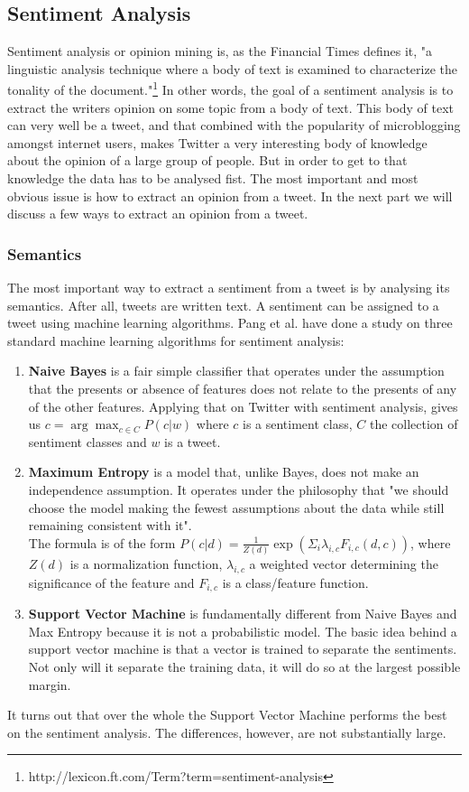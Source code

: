 \documentclass{article}
\begin{document}
\subsection{Sentiment Analysis}
Sentiment analysis or opinion mining is, as the Financial Times defines it, "a linguistic analysis technique where a body of text is examined to characterize the tonality of the document."\footnote{http://lexicon.ft.com/Term?term=sentiment-analysis} In other words, the goal of a sentiment analysis is to extract the writers opinion on some topic from a body of text. This body of text can very well be a tweet, and that combined with the popularity of microblogging amongst internet users, makes Twitter a very interesting body of knowledge about the opinion of a large group of people. But in order to get to that knowledge the data has to be analysed fist. 
The most important and most obvious issue is how to extract an opinion from a tweet. In the next part we will discuss a few ways to extract an opinion from a tweet.
\subsubsection{Semantics }
The most important way to extract a sentiment from a tweet is by analysing its semantics. After all, tweets are written text. A sentiment can be assigned to a tweet using machine learning algorithms. Pang et al. \cite{machineLearning} have done a study on three standard machine learning algorithms for sentiment analysis: 
\begin{enumerate}
\item \textbf{Naive Bayes} is a fair simple classifier that operates under the assumption that the presents or absence of features does not relate to the presents of any of the other features. Applying that on Twitter with sentiment analysis, gives us $c = \arg\max_{c\in C} P(c|w)$ where $c$ is a sentiment class, $C$ the collection of sentiment classes and $w$ is a tweet. \cite{sentAnalysis}
\item \textbf{Maximum Entropy} is a model that, unlike Bayes, does not make an independence assumption. It operates under the philosophy that "we should choose the model making the fewest assumptions about the data while still remaining consistent with it".\cite{machineLearning} \\
The formula is of the form $P(c|d) = \frac{1}{Z(d)}\exp(\Sigma_i \lambda_{i,c}F_{i,c}(d,c))$, where $Z(d)$ is a normalization function, $\lambda_{i,c}$ a weighted vector determining the significance of the feature and $F_{i,c}$ is a class/feature function. 
\item \textbf{Support Vector Machine} is fundamentally different from Naive Bayes and Max Entropy because it is not a probabilistic model. The basic idea behind a support vector machine is that a vector is trained to separate the sentiments. Not only will it separate the training data, it will do so at the largest possible margin. 
\end{enumerate}
It turns out that over the whole the Support Vector Machine performs the best on the sentiment analysis\cite{machineLearning}. The differences, however, are not substantially large. 
\end{document}
